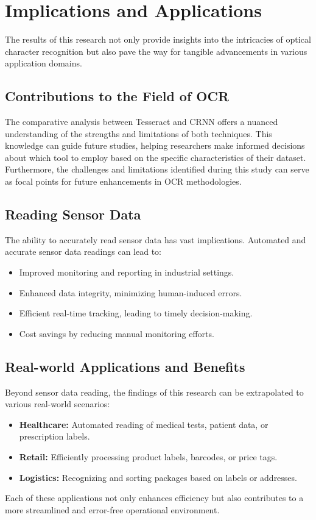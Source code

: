 \section{Implications and Applications}

The results of this research not only provide insights into the intricacies of optical character recognition but also pave the way for tangible advancements in various application domains.

\subsection{Contributions to the Field of OCR}
The comparative analysis between Tesseract and CRNN offers a nuanced understanding of the strengths and limitations of both techniques. This knowledge can guide future studies, helping researchers make informed decisions about which tool to employ based on the specific characteristics of their dataset. Furthermore, the challenges and limitations identified during this study can serve as focal points for future enhancements in OCR methodologies.

\subsection{Reading Sensor Data}
The ability to accurately read sensor data has vast implications. Automated and accurate sensor data readings can lead to:
\begin{itemize}
    \item Improved monitoring and reporting in industrial settings.
    \item Enhanced data integrity, minimizing human-induced errors.
    \item Efficient real-time tracking, leading to timely decision-making.
    \item Cost savings by reducing manual monitoring efforts.
\end{itemize}

\subsection{Real-world Applications and Benefits}
Beyond sensor data reading, the findings of this research can be extrapolated to various real-world scenarios:
\begin{itemize}
    \item \textbf{Healthcare:} Automated reading of medical tests, patient data, or prescription labels.
    \item \textbf{Retail:} Efficiently processing product labels, barcodes, or price tags.
    \item \textbf{Logistics:} Recognizing and sorting packages based on labels or addresses.
\end{itemize}
Each of these applications not only enhances efficiency but also contributes to a more streamlined and error-free operational environment.

